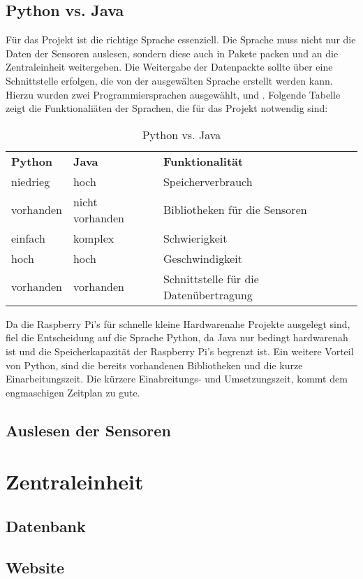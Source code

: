 \subsection{Python vs. Java}
Für das Projekt ist die richtige Sprache essenziell. Die Sprache muss nicht nur die Daten der Sensoren auslesen, sondern diese auch in Pakete packen und an die Zentraleinheit weitergeben. Die Weitergabe der Datenpackte sollte über eine Schnittstelle erfolgen, die von der ausgewälten Sprache erstellt werden kann. Hierzu wurden zwei Programmiersprachen ausgewählt,  und . Folgende Tabelle zeigt die Funktionaliäten der Sprachen, die für das Projekt notwendig sind:\hfill

\begin{table}[h]
	\centering
	\caption{Python vs. Java}
	\label{my-label}
	\begin{tabular}{lll}
	\textbf{Python} & \textbf{Java} & \textbf{Funktionalität}  \\
	niedrieg & hoch &  Speicherverbrauch\\
	vorhanden & nicht vorhanden & Bibliotheken für die Sensoren \\
	einfach & komplex & Schwierigkeit \\
	hoch & hoch & Geschwindigkeit \\
	vorhanden & vorhanden & Schnittstelle für die Datenübertragung
	\end{tabular}
\end{table}
\noindent Da die Raspberry Pi's für schnelle kleine Hardwarenahe Projekte ausgelegt sind, fiel die Entscheidung auf die Sprache Python, da Java nur bedingt hardwarenah ist und die Speicherkapazität der Raspberry Pi's begrenzt ist. Ein weitere Vorteil von Python, sind die bereits vorhandenen Bibliotheken und die kurze Einarbeitungszeit. Die kürzere Einabreitungs- und Umsetzungszeit, kommt dem engmaschigen Zeitplan zu gute.

\subsection{Auslesen der Sensoren}

\section{Zentraleinheit}
\subsection{Datenbank}
\subsection{Website}

